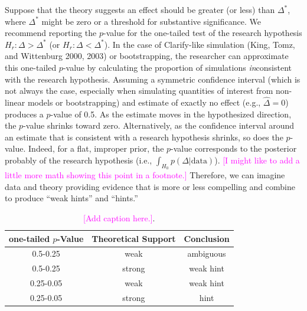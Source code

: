 \documentclass[12pt]{article}
\newcommand{\carlisle}[1]{\textcolor{magenta}{#1}}
\begin{document}
Suppose that the theory suggests an effect should be greater (or less) than $\Delta^*$, where $\Delta^*$ might be zero or a threshold for substantive significance. We recommend reporting the $p$-value for the one-tailed test of the research hypothesis $H_r: \Delta > \Delta^*$ (or $H_r: \Delta < \Delta^*$). In the case of Clarify-like simulation (King, Tomz, and Wittenburg 2000, 2003) or bootstrapping, the researcher can approximate this one-tailed $p$-value by calculating the proportion of simulations \textit{in}consistent with the research hypothesis. Assuming a symmetric confidence interval (which is not always the case, especially when simulating quantities of interest from non-linear models or bootstrapping) and estimate of exactly no effect (e.g., $\hat{\Delta} = 0$) produces a $p$-value of 0.5. As the estimate moves in the hypothesized direction, the $p$-value shrinks toward zero. Alternatively, as the confidence interval around an estimate that is consistent with a research hypothesis shrinks, so does the $p$-value. Indeed, for a flat, improper prior, the $p$-value corresponds to the posterior probably of the research hypothesis (i.e., $\int_{H_0}p(\Delta | \text{data})$). \carlisle{[I might like to add a little more math showing this point in a footnote.]} Therefore, we can imagine data and theory providing evidence that is more or less compelling and combine to produce ``weak hints'' and ``hints.'' 

\begin{table}
\begin{center}
\begin{tabular}{|ccc|}
\hline
one-tailed $p$-Value & Theoretical Support & Conclusion\\ 
\hline
0.5-0.25& weak & ambiguous\\
0.5-0.25& strong & weak hint\\
0.25-0.05& weak & weak hint\\
0.25-0.05& strong & hint\\
\hline
\end{tabular}\caption{\carlisle{[Add caption here.]}.}\label{tab:hints}
\end{center}
\end{table}
\end{document}
